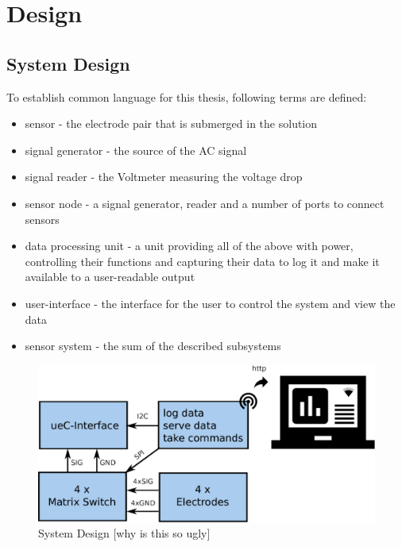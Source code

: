 \chapter{Design}

\section{System Design}

To establish common language for this thesis, following terms are defined:

\begin{itemize}
    \item sensor - the electrode pair that is submerged in the solution
    \item signal generator - the source of the AC signal
    \item signal reader - the Voltmeter measuring the voltage drop
    \item sensor node - a signal generator, reader and a number of ports to connect sensors
    \item data processing unit - a unit providing all of the above with power, controlling their functions and capturing their data to log it and make it available to a user-readable output
    \item user-interface - the interface for the user to control the system and view the data
    \item sensor system - the sum of the described subsystems
\end{itemize}

\begin{figure}
	\begin{center}
		\includegraphics[width=\textwidth]{images/systemdesign.pdf} 
		\caption{System Design [why is this so ugly]}
	\end{center}
\end{figure}

